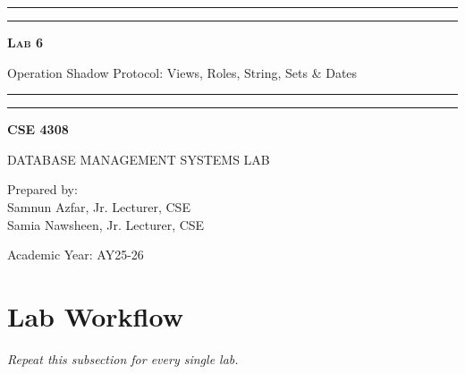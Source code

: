 \documentclass[12pt,a4paper]{article}
\newcommand{\labNo}{Lab 6}
\newcommand{\labTopic}{Operation Shadow Protocol: Views, Roles, String, Sets \& Dates}
\newcommand{\courseCode}{CSE 4308}
\newcommand{\courseTitleLong}{DATABASE MANAGEMENT SYSTEMS LAB}
\newcommand{\instructorName}{Samnun Azfar, Jr. Lecturer, CSE\\ Samia Nawsheen, Jr. Lecturer, CSE}
\newcommand{\academicYear}{AY25-26}
\begin{document}
\begin{titlepage}
    \centering
    \vspace*{2\baselineskip}

    \rule{14cm}{2pt}\vspace*{-0.8\baselineskip}\vspace*{1.5pt}
    \rule{14cm}{0.5pt}\vspace{2\baselineskip}

    {\Huge\bfseries\scshape \labNo\par} 
    \vspace{3mm}
    {\Large \labTopic} 
    \vspace{3mm}

    \rule{14cm}{0.5pt}\vspace*{-0.7\baselineskip}\vspace{2.5pt}
    \rule{14cm}{2pt}

    \vspace{2\baselineskip}

    {\Large\bfseries \courseCode\par} 
    \vspace{1\baselineskip}
    {\large \courseTitleLong\par} 

    \vfill
    {\normalsize Prepared by:\\ \instructorName\par} 
    {\normalsize Academic Year: \academicYear\par} 
\end{titlepage}

\newpage
\tableofcontents
\newpage
\section*{Lab Workflow}



\textit{Repeat this subsection for every single lab.}
\end{document}
